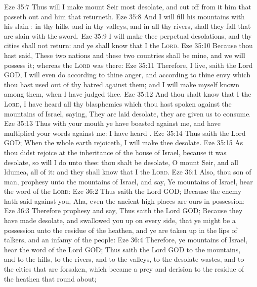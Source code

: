 \vs Eze 35:7 Thus will I make mount Seir most desolate, and cut off from it him that passeth out and him that returneth.
\vs Eze 35:8 And I will fill his mountains with his slain : in thy hills, and in thy valleys, and in all thy rivers, shall they fall that are slain with the sword.
\vs Eze 35:9 I will make thee perpetual desolations, and thy cities shall not return: and ye shall know that I  the \textsc{Lord}.
\vs Eze 35:10 Because thou hast said, These two nations and these two countries shall be mine, and we will possess it; whereas the \textsc{Lord} was there:
\vs Eze 35:11 Therefore,  I live, saith the Lord GOD, I will even do according to thine anger, and according to thine envy which thou hast used out of thy hatred against them; and I will make myself known among them, when I have judged thee.
\vs Eze 35:12 And thou shalt know that I  the \textsc{Lord},  I have heard all thy blasphemies which thou hast spoken against the mountains of Israel, saying, They are laid desolate, they are given us to consume.
\vs Eze 35:13 Thus with your mouth ye have boasted against me, and have multiplied your words against me: I have heard .
\vs Eze 35:14 Thus saith the Lord GOD; When the whole earth rejoiceth, I will make thee desolate.
\vs Eze 35:15 As thou didst rejoice at the inheritance of the house of Israel, because it was desolate, so will I do unto thee: thou shalt be desolate, O mount Seir, and all Idumea,  all of it: and they shall know that I  the \textsc{Lord}.
\vs Eze 36:1 Also, thou son of man, prophesy unto the mountains of Israel, and say, Ye mountains of Israel, hear the word of the \textsc{Lord}:
\vs Eze 36:2 Thus saith the Lord GOD; Because the enemy hath said against you, Aha, even the ancient high places are ours in possession:
\vs Eze 36:3 Therefore prophesy and say, Thus saith the Lord GOD; Because they have made  desolate, and swallowed you up on every side, that ye might be a possession unto the residue of the heathen, and ye are taken up in the lips of talkers, and  an infamy of the people:
\vs Eze 36:4 Therefore, ye mountains of Israel, hear the word of the Lord GOD; Thus saith the Lord GOD to the mountains, and to the hills, to the rivers, and to the valleys, to the desolate wastes, and to the cities that are forsaken, which became a prey and derision to the residue of the heathen that  round about;
